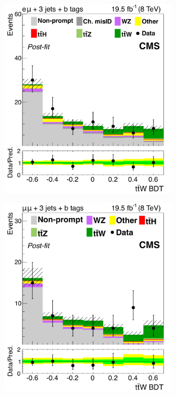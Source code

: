 \begin{figure}[tb]
\begin{subfigure}{0.33\textwidth}
    \includegraphics[width=\textwidth]{figures/eight-TeV/mva/mu_ele_eq3j_bloose_FinalBDT}
    \caption{}
    \label{sfig:8-ttW-tc}
  \end{subfigure}%
  \begin{subfigure}{0.33\textwidth}
    \includegraphics[width=\textwidth]{figures/eight-TeV/mva/mu_mu_eq3j_bloose_FinalBDT}

\end{subfigure}
\end{figure}
